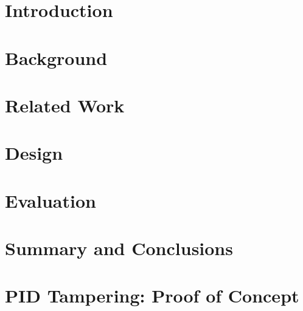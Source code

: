 \documentclass[a4paper,12pt,twoside,openright]{report}
\begin{document}
\pagestyle{empty}
\singlespacing
{}

\restoregeometry
\onehalfspacing

\singlespacing


\setcounter{page}{0}
\pagestyle{plain}
\tableofcontents
{}
\listoffigures
{}
\listoftables

\onehalfspacing

\raggedbottom

\chapter{Introduction}
\setcounter{page}{1} 


\chapter{Background} 
\label{sec:background}


\chapter{Related Work} 
\label{sec:related}


\chapter{Design}
\label{sec:design}


\chapter{Evaluation} 
\label{sec:eval}


\chapter{Summary and Conclusions}
\label{sec:conclusion}



\appendix
\singlespacing

\chapter{PID Tampering: Proof of Concept}
\label{appendix:pid-tampering}
\end{document}
